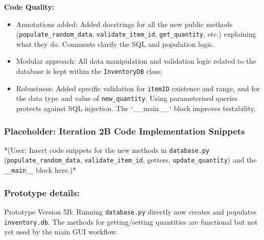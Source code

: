 \textbf{Code Quality:}
\begin{itemize}
	\item Annotations added: Added docstrings for all the new public methods (\verb|populate_random_data|, \verb|validate_item_id|, \verb|get_quantity|, etc.) explaining what they do. Comments clarify the SQL and population logic.
	\item Modular approach: All data manipulation and validation logic related to the database is kept within the \verb|InventoryDB| class.
	\item Robustness: Added specific validation for \verb|itemID| existence and range, and for the data type and value of \verb|new_quantity|. Using parameterised queries protects against SQL injection. The `__main__` block improves testability.
\end{itemize}

\newpage
\subsubsection*{Placeholder: Iteration 2B Code Implementation Snippets}
*(User: Insert code snippets for the new methods in \verb|database.py| (\verb|populate_random_data|, \verb|validate_item_id|, getters, \verb|update_quantity|) and the \verb|__main__| block here.)*
\newpage

\subsubsection{Prototype details:}
Prototype Version 5B: Running \verb|database.py| directly now creates and populates \verb|inventory.db|. The methods for getting/setting quantities are functional but not yet used by the main GUI workflow.

